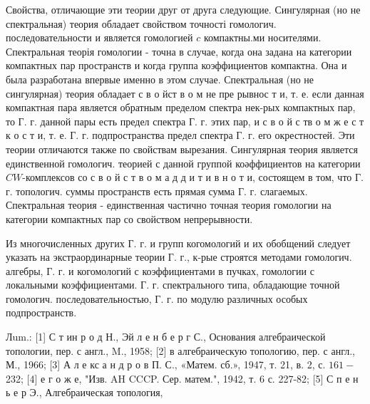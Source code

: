 \documentclass[10pt]{article}
\begin{document}
Свойства, отличающие эти теории друг от друга следующие. Сингулярная (но не спектральная) теория обладает свойством точності гомологич. последовательности и является гомологией $c$ компактны.ми носителями. Спектральная теорія гомологии - точна в случае, когда она задана на категории компактных пар пространств и когда группа коэффициентов компактна. Она и была разработана впервые именно в этом случае. Спектральная (но не сингулярная) теория обладает с в о йст в о м не пре рывнос т и, т. е. если данная компактная пара является обратным пределом спектра нек-рых компактных пар, то Г. г. данной пары есть предел спектра Г. г. этих пар, и с в о й с тв о м ж е с т к о с т и, т. е. Г. г. подпространства предел спектра Г. г. его окрестностей. Эти теории отличаются также по свойствам вырезания. Сингулярная теория является единственной гомологич. теорией с данной группой коәффициентов на категории $C W$-комплексов со с в о й с т в о м а д д и т и в н о т и, состоящем в том, что Г. г. топологич. суммы пространств есть прямая сумма Г. г. слагаемых. Спектральная теория - единственная частично точная теория гомологии на категории компактных пар со свойством непрерывности.



Из многочисленных других Г. г. и групп когомологий и их обобщений следует указать на экстраординарные теории Г. г., к-рые строятся методами гомологич. алгебры, Г. г. и когомологий с коэффициентами в пучках, гомологии с локальными коэффициентами. Г. г. спектрального типа, обладающие точной гомологич. последовательностью, Г. г. по модулю различных особых подпространств.



Лum.: [1] С т ин р о д Н., Эй л е н б е р г С., Основания алгебраической топологии, пер. с англ., M., 1958; [2] в алгебраическую топологию, пер. с англ., М., 1966; [3] А л е кс а н д р о в П. С., «Матем. сб.», 1947, т. 21, в. 2, с. $161-$ 232; [4] е г о ж е, "Изв. AH CCCP. Сер. матем.", 1942, т. 6 с. 227-82; [5] С п е н ь е р Э., Алгебраическая топология,
\end{document}
